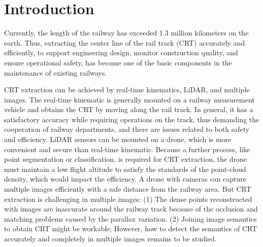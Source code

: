 \section{Introduction}

Currently,
the length of the railway has exceeded 1.3 million kilometers on the earth.
Thus,
extracting the center line of the rail track (CRT) accurately and efficiently, 
to support engineering design, monitor construction quality, 
and ensure operational safety,
has become one of the basic components in the maintenance of existing railways.

CRT extraction can be achieved by real-time kinematics, LiDAR,
and multiple images.
The real-time kinematic is generally mounted on a railway measurement vehicle and obtains the CRT by moving along the rail track.
In general, 
it has a satisfactory accuracy while requiring operations on the track,
thus demanding the cooperation of railway departments, 
and there are issues related to both safety and efficiency.
LiDAR sensors can be mounted on a drone, 
which is more convenient and secure than real-time kinematic. 
Because a further process, 
like point segmentation or classification,
is required for CRT extraction,
the drone must maintain a low flight altitude to satisfy the standards of the point-cloud density,
which would impact the efficiency.
A drone with cameras can capture multiple images efficiently with a safe distance from the railway area.
But CRT extraction is challenging in multiple images:
(1) The dense points reconstructed with images are inaccurate around the railway track because of the occlusion and matching problems caused by the parallax variation.
(2) Joining image semantics to obtain CRT might be workable;
However,
how to detect the semantics of CRT accurately and completely in multiple images remains to be studied.












